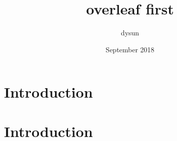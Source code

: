 \documentclass{article}
\title{overleaf first}
\author{dysun }
\date{September 2018}
\begin{document}
\maketitle

\section{Introduction}

\section{Introduction}
\end{document}

